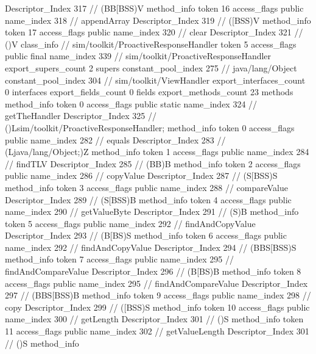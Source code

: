 {{{{{					Descriptor_Index	317		// (BB[BSS)V
				}
				method_info {
					token	16
					access_flags	public
					name_index	318		// appendArray
					Descriptor_Index	319		// ([BSS)V
				}
				method_info {
					token	17
					access_flags	public
					name_index	320		// clear
					Descriptor_Index	321		// ()V
				}
			}
		}
		class_info {		// sim/toolkit/ProactiveResponseHandler
			token	5
			access_flags	public final
			name_index	339		// sim/toolkit/ProactiveResponseHandler
			export_supers_count	2
			supers {
				constant_pool_index	275		// java/lang/Object
				constant_pool_index	304		// sim/toolkit/ViewHandler
			}
			export_interfaces_count	0
			interfaces {
			}
			export_fields_count	0
			fields {
			}
			export_methods_count	23
			methods {
				method_info {
					token	0
					access_flags	public static
					name_index	324		// getTheHandler
					Descriptor_Index	325		// ()Lsim/toolkit/ProactiveResponseHandler;
				}
				method_info {
					token	0
					access_flags	public
					name_index	282		// equals
					Descriptor_Index	283		// (Ljava/lang/Object;)Z
				}
				method_info {
					token	1
					access_flags	public
					name_index	284		// findTLV
					Descriptor_Index	285		// (BB)B
				}
				method_info {
					token	2
					access_flags	public
					name_index	286		// copyValue
					Descriptor_Index	287		// (S[BSS)S
				}
				method_info {
					token	3
					access_flags	public
					name_index	288		// compareValue
					Descriptor_Index	289		// (S[BSS)B
				}
				method_info {
					token	4
					access_flags	public
					name_index	290		// getValueByte
					Descriptor_Index	291		// (S)B
				}
				method_info {
					token	5
					access_flags	public
					name_index	292		// findAndCopyValue
					Descriptor_Index	293		// (B[BS)S
				}
				method_info {
					token	6
					access_flags	public
					name_index	292		// findAndCopyValue
					Descriptor_Index	294		// (BBS[BSS)S
				}
				method_info {
					token	7
					access_flags	public
					name_index	295		// findAndCompareValue
					Descriptor_Index	296		// (B[BS)B
				}
				method_info {
					token	8
					access_flags	public
					name_index	295		// findAndCompareValue
					Descriptor_Index	297		// (BBS[BSS)B
				}
				method_info {
					token	9
					access_flags	public
					name_index	298		// copy
					Descriptor_Index	299		// ([BSS)S
				}
				method_info {
					token	10
					access_flags	public
					name_index	300		// getLength
					Descriptor_Index	301		// ()S
				}
				method_info {
					token	11
					access_flags	public
					name_index	302		// getValueLength
					Descriptor_Index	301		// ()S
				}
				method_info {
}}}}}
